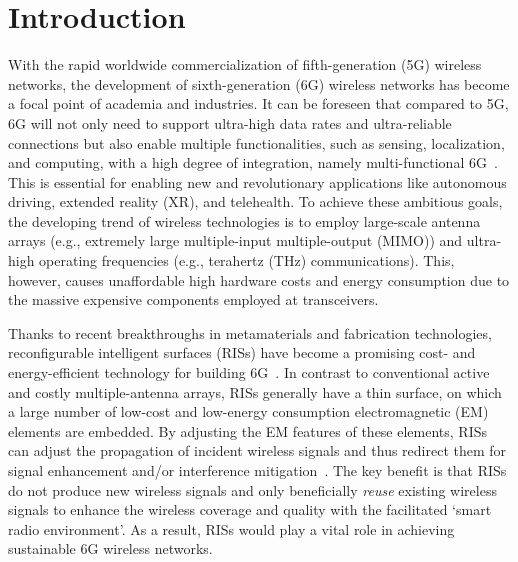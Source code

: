 \documentclass[journal]{IEEEtran}
\theoremstyle{definition}
\begin{document}
\section{Introduction}
With the rapid worldwide commercialization of fifth-generation (5G) wireless networks, the development of sixth-generation (6G) wireless networks has become a focal point of academia and industries. It can be foreseen that compared to 5G, 6G will not only need to support ultra-high data rates and ultra-reliable connections but also enable multiple functionalities, such as sensing, localization, and computing, with a high degree of integration, namely multi-functional 6G~\cite{10529727}. This is essential for enabling new and revolutionary applications like autonomous driving, extended reality (XR), and telehealth. To achieve these ambitious goals, the developing trend of wireless technologies is to employ large-scale antenna arrays (e.g., extremely large multiple-input multiple-output (MIMO)) and ultra-high operating frequencies (e.g., terahertz (THz) communications). This, however, causes unaffordable high hardware costs and energy consumption due to the massive expensive components employed at transceivers.

Thanks to recent breakthroughs in metamaterials and fabrication technologies, reconfigurable intelligent surfaces (RISs) have become a promising cost- and energy-efficient technology for building 6G~\cite{9140329}. In contrast to conventional active and costly multiple-antenna arrays, RISs generally have a thin surface, on which a large number of low-cost and low-energy consumption electromagnetic (EM) elements are embedded. By adjusting the EM features of these elements, RISs can adjust the propagation of incident wireless signals and thus redirect them for signal enhancement and/or interference mitigation~\cite{9140329}. The key benefit is that RISs do not produce new wireless signals and only beneficially \emph{reuse} existing wireless signals to enhance the wireless coverage and quality with the facilitated `smart radio environment'. As a result, RISs would play a vital role in achieving sustainable 6G wireless networks. 
\end{document}
